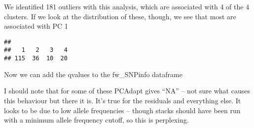 \documentclass[11pt,]{article}
\newenvironment{Shaded}{\begin{snugshade}}{\end{snugshade}}
\newcommand{\KeywordTok}[1]{\textcolor[rgb]{0.13,0.29,0.53}{\textbf{#1}}}
\newcommand{\DecValTok}[1]{\textcolor[rgb]{0.00,0.00,0.81}{#1}}
\newcommand{\FloatTok}[1]{\textcolor[rgb]{0.00,0.00,0.81}{#1}}
\newcommand{\StringTok}[1]{\textcolor[rgb]{0.31,0.60,0.02}{#1}}
\newcommand{\CommentTok}[1]{\textcolor[rgb]{0.56,0.35,0.01}{\textit{#1}}}
\newcommand{\OperatorTok}[1]{\textcolor[rgb]{0.81,0.36,0.00}{\textbf{#1}}}
\newcommand{\NormalTok}[1]{#1}
\begin{document}
\begin{Shaded}
\end{Shaded}

We identified 181 outliers with this analysis, which are associated with
4 of the 4 clusters. If we look at the distribution of these, though, we
see that most are associated with PC 1

\begin{Shaded}
\end{Shaded}

\begin{verbatim}
## 
##   1   2   3   4 
## 115  36  10  20
\end{verbatim}

Now we can add the qvalues to the fw\_SNPinfo dataframe

\begin{Shaded}
\end{Shaded}

I should note that for some of these PCAdapt gives ``NA'' -- not sure
what causes this behaviour but there it is. It's true for the residuals
and everything else. It looks to be due to low allele frequencies --
though stacks should have been run with a minimum allele frequency
cutoff, so this is perplexing.
\end{document}
